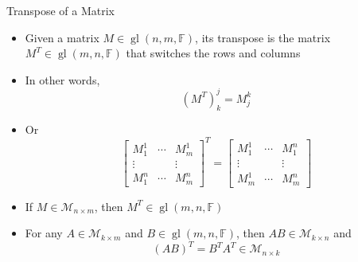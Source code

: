 \documentclass[usenames,dvipsnames,10pt]{beamer}
\newcommand\F{\mathbb{F}}
\newcommand{\gl}{\operatorname{gl}}
\begin{document}
\begin{frame}
  {Transpose of a Matrix}

  \begin{itemize}
  \item Given a matrix $M \in \gl(n,m,\F)$, its transpose is the matrix $M^T \in \gl(m,n,\F)$ that switches the rows and columns
  \item In other words,
    \[
      (M^T)^j_k = M^k_j
    \]
  \item Or
    \[
      \begin{bmatrix} M^1_1 & \cdots & M^1_m \\ \vdots & & \vdots \\ M^n_1 & \cdots & M^n_m \end{bmatrix}^T
      =
      \begin{bmatrix} M^1_1 & \cdots & M^n_1 \\ \vdots & & \vdots \\ M^1_m & \cdots & M^n_m \end{bmatrix}
    \]
  \item If $M \in \mathcal{M}_{n\times m}$, then $M^T \in \gl(m,n,\F)$
  \item For any $A \in \mathcal{M}_{k\times m}$ and $B \in \gl(m,n,\F)$, then $AB \in \mathcal{M}_{k\times n}$ and
    \[
      (AB)^T = B^TA^T \in \mathcal{M}_{n\times k}
    \]
  \end{itemize}
\end{frame}
\end{document}
